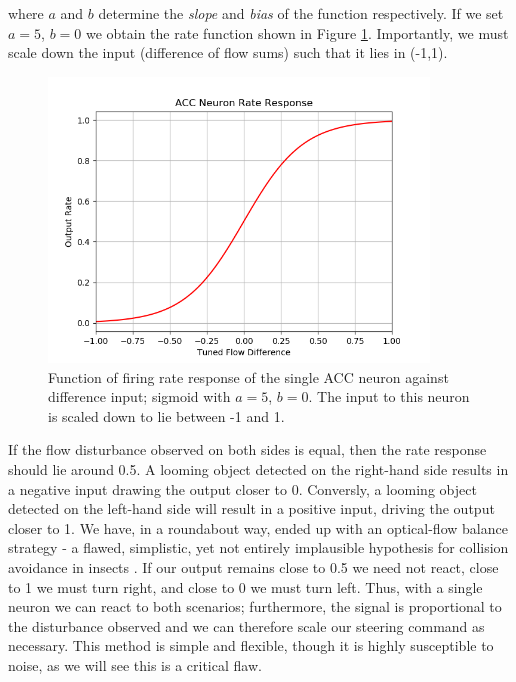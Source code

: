 \documentclass[a4paper,11pt,twoside,openright]{article}
\begin{document}
where $a$ and $b$ determine the \textit{slope} and \textit{bias} of
the function respectively. If we set $a = 5$, $b = 0$ we obtain the
rate function shown in Figure \ref{fig:accrate}. Importantly, we must
scale down the input (difference of flow sums) such that it lies in
(-1,1).\newline\par

\begin{figure}[h!]
  \centering
  \includegraphics[width=0.9\textwidth]{ACCRate}
  \caption{\label{fig:accrate} Function of firing rate response of the single ACC
    neuron against difference input; sigmoid with $a = 5$, $b = 0$. The input to
  this neuron is scaled down to lie between -1 and 1.}
\end{figure}

If the flow disturbance observed on both sides is equal, then the rate
response should lie around 0.5. A looming object detected on the
right-hand side results in a negative input drawing the output closer
to 0. Conversly, a looming object detected on the left-hand side will
result in a positive input, driving the output closer to 1. We have,
in a roundabout way, ended up with an optical-flow balance strategy -
a flawed, simplistic, yet not entirely implausible hypothesis for
collision avoidance in insects \cite{Julien2017}. If our output
remains close to 0.5 we need not react, close to 1 we must turn right,
and close to 0 we must turn left. Thus, with a single neuron we can
react to both scenarios; furthermore, the signal is proportional to
the disturbance observed and we can therefore scale our steering
command as necessary. This method is simple and flexible, though it is
highly susceptible to noise, as we will see this is a critical flaw.
\newline\par
\end{document}
